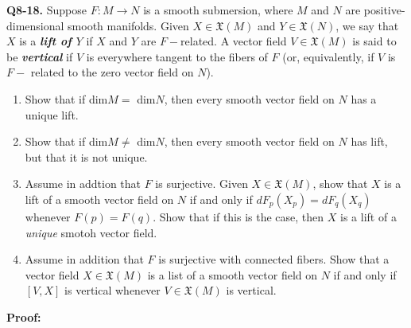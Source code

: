 \documentclass{article}
\begin{document}
\textbf{Q8-18.} Suppose $F : M \rightarrow N$ is a smooth submersion, where $M$ and $N$ are positive-dimensional smooth manifolds. Given $X \in \mathfrak{X}(M)$ and $Y \in \mathfrak{X}(N)$, we say that $X$ is a \emph{\textbf{lift of $Y$}} if $X$ and $Y$ are $F-$related. A vector field $V \in \mathfrak{X}(M)$ is said to be \emph{\textbf{vertical}} if $V$ is everywhere tangent to the fibers of $F$ (or, equivalently, if $V$ is $F-$ related to the zero vector field on $N$).
\begin{enumerate}[label=(\alph*)]
  \item Show that if dim$M = $ dim$N$, then every smooth vector field on $N$ has a unique lift.
  \item Show that if dim$M \neq $ dim$N$, then every smooth vector field on $N$ has lift, but that it is not unique.
  \item Assume in addtion that $F$ is surjective. Given $X \in \mathfrak{X}(M)$, show that $X$ is a lift of a smooth vector field on $N$ if and only if $dF_p \left(X_p\right) = dF_q \left(X_q\right) $ whenever $F(p) = F(q)$. Show that if this is the case, then $X$ is a lift of a \emph{unique} smotoh vector field.
  \item Assume in addition that $F$ is surjective with connected fibers. Show that a vector field $X \in \mathfrak{X}(M)$ is a list of a smooth vector field on $N$ if and only if $\left[V, X\right]$ is vertical whenever $V \in \mathfrak{X}(M)$ is vertical.   
\end{enumerate}

\vskip 0.5cm
\textbf{Proof:}
\end{document}
